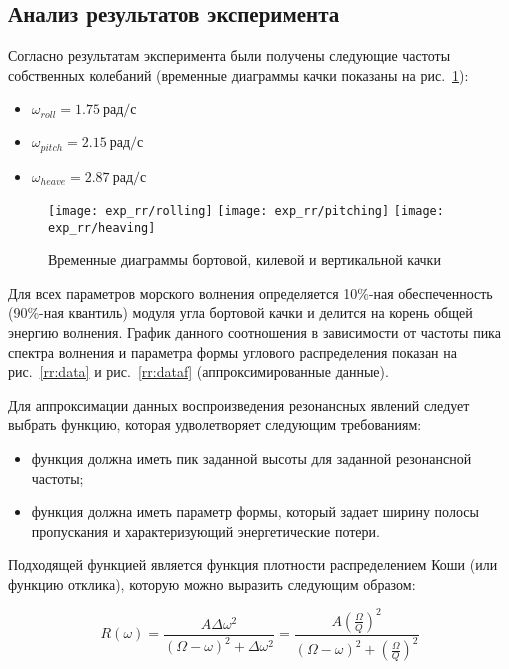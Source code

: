 \subsection{Анализ результатов эксперимента}

Согласно результатам эксперимента были получены следующие частоты собственных колебаний (временные диаграммы качки показаны на рис.~\ref{exp_rr_rolling}):
\begin{itemize}
	\item	$ \omega_{roll} = 1.75\ \text{рад/с}$
	\item	$ \omega_{pitch} = 2.15\ \text{рад/с}$
	\item	$ \omega_{heave} = 2.87\ \text{рад/с}$
\end{itemize}

\begin{figure}[ht]
	\begin{center}
	\texttt{[image: exp\_rr/rolling]}
	\texttt{[image: exp\_rr/pitching]}
	\texttt{[image: exp\_rr/heaving]}
	\end{center}
	\caption{Временные диаграммы бортовой, килевой и вертикальной качки}
	\label{exp_rr_rolling}
\end{figure}

Для всех параметров морского волнения определяется 10\%-ная обеспеченность (90\%-ная квантиль) модуля угла бортовой качки и делится на корень общей энергию волнения. График данного соотношения в зависимости от частоты пика спектра волнения и параметра формы углового распределения показан на рис.~\ref{rr:data} и рис.~\ref{rr:dataf} (аппроксимированные данные).

Для аппроксимации данных воспроизведения резонансных явлений следует выбрать функцию, которая удволетворяет следующим требованиям: 
\begin{itemize}
	\item	функция должна иметь пик заданной высоты для заданной резонансной частоты;
	\item	функция должна иметь параметр формы, который задает ширину полосы пропускания и характеризующий
			энергетические потери.  
\end{itemize} 

Подходящей функцией является функция плотности распределением Коши (или функцию отклика), которую можно выразить следующим образом:

\begin{equation}
	R(\omega) = \frac{A \Delta \omega^2} {  (\Omega-\omega)^2 + \Delta \omega^2 } 
		 = \frac{A \left( \frac{\Omega}{Q} \right) ^2} {  (\Omega-\omega)^2 + \left( \frac{\Omega}{Q} \right) ^2 } 
\label{cauchy}
\end{equation}


